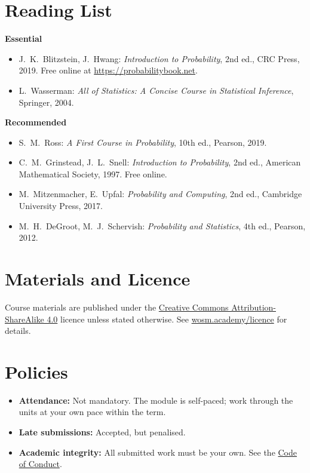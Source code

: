 \documentclass[11pt,a4paper]{article}
\begin{document}
\section{Reading List}
\textbf{Essential}
\begin{itemize}
  \item J.\ K.\ Blitzstein, J.\ Hwang: \textit{Introduction to Probability}, 2nd ed., CRC Press, 2019. Free online at \url{https://probabilitybook.net}.
  \item L.\ Wasserman: \textit{All of Statistics: A Concise Course in Statistical Inference}, Springer, 2004.
\end{itemize}
\textbf{Recommended}
\begin{itemize}
  \item S.\ M.\ Ross: \textit{A First Course in Probability}, 10th ed., Pearson, 2019.
  \item C.\ M.\ Grinstead, J.\ L.\ Snell: \textit{Introduction to Probability}, 2nd ed., American Mathematical Society, 1997. Free online.
  \item M.\ Mitzenmacher, E.\ Upfal: \textit{Probability and Computing}, 2nd ed., Cambridge University Press, 2017.
  \item M.\ H.\ DeGroot, M.\ J.\ Schervish: \textit{Probability and Statistics}, 4th ed., Pearson, 2012.
\end{itemize}

\section{Materials and Licence}
Course materials are published under the
\href{https://creativecommons.org/licenses/by-sa/4.0/}{Creative Commons Attribution-ShareAlike 4.0}
licence unless stated otherwise. See \href{https://wosm.academy/licence/}{wosm.academy/licence} for details.

\section{Policies}
\begin{itemize}
  \item \textbf{Attendance:} Not mandatory. The module is self-paced; work through the units at your own pace within the term.
  \item \textbf{Late submissions:} Accepted, but penalised.
  \item \textbf{Academic integrity:} All submitted work must be your own.
        See the \href{https://wosm.academy/code-of-conduct/}{Code of Conduct}.
\end{itemize}
\end{document}
